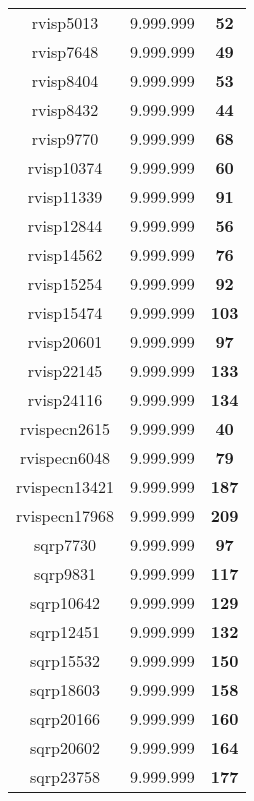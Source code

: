 \begin{tabular}{cc||c}
rvisp5013        & 9.999.999        & {\bf 52}        \\ 
rvisp7648        & 9.999.999        & {\bf 49}        \\ 
rvisp8404        & 9.999.999        & {\bf 53}        \\ 
rvisp8432        & 9.999.999        & {\bf 44}        \\ 
rvisp9770        & 9.999.999        & {\bf 68}        \\ 
rvisp10374       & 9.999.999        & {\bf 60}        \\ 
rvisp11339       & 9.999.999        & {\bf 91}        \\ 
rvisp12844       & 9.999.999        & {\bf 56}        \\ 
rvisp14562       & 9.999.999        & {\bf 76}        \\ 
rvisp15254       & 9.999.999        & {\bf 92}        \\ 
rvisp15474       & 9.999.999        & {\bf 103}       \\ 
rvisp20601       & 9.999.999        & {\bf 97}        \\ 
rvisp22145       & 9.999.999        & {\bf 133}       \\ 
rvisp24116       & 9.999.999        & {\bf 134}       \\ 
rvispecn2615     & 9.999.999        & {\bf 40}        \\ 
rvispecn6048     & 9.999.999        & {\bf 79}        \\ 
rvispecn13421    & 9.999.999        & {\bf 187}       \\ 
rvispecn17968    & 9.999.999        & {\bf 209}       \\ 
sqrp7730         & 9.999.999        & {\bf 97}        \\ 
sqrp9831         & 9.999.999        & {\bf 117}       \\ 
sqrp10642        & 9.999.999        & {\bf 129}       \\ 
sqrp12451        & 9.999.999        & {\bf 132}       \\ 
sqrp15532        & 9.999.999        & {\bf 150}       \\ 
sqrp18603        & 9.999.999        & {\bf 158}       \\ 
sqrp20166        & 9.999.999        & {\bf 160}       \\ 
sqrp20602        & 9.999.999        & {\bf 164}       \\ 
sqrp23758        & 9.999.999        & {\bf 177}       \\ 

\end{tabular}
